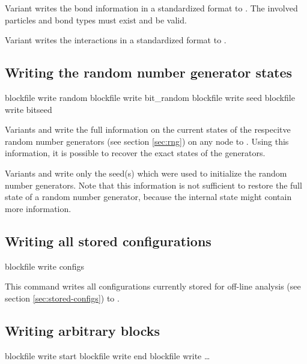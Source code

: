 Variant  writes the bond information in a standardized
format to . The involved particles and bond types must
exist and be valid.

Variant  writes the interactions in a standardized format
to .

\subsection{Writing the random number generator states}
\begin{essyntax}
   blockfile  write random
   blockfile  write bit_random
   blockfile  write seed
   blockfile  write bitseed
\end{essyntax}

Variants  and  write the full information on the
current states of the respecitve random number generators (see section
\vref{sec:rng}) on any node to .  Using this information,
it is possible to recover the exact states of the generators.

Variants  and  write only the seed(s) which were
used to initialize the random number generators. Note that this
information is not sufficient to restore the full state of a random
number generator, because the internal state might contain more
information.

\subsection{Writing all stored configurations}
\label{sec:blockfile:configs}
\begin{essyntax}
  blockfile  write configs
\end{essyntax}

This command writes all configurations currently stored for off-line
analysis (see section \vref{sec:stored-configs}) to .

\subsection{Writing arbitrary blocks}

\begin{essyntax}
   blockfile  write start 
   blockfile  write end
   blockfile  write  \dots
\end{essyntax}

